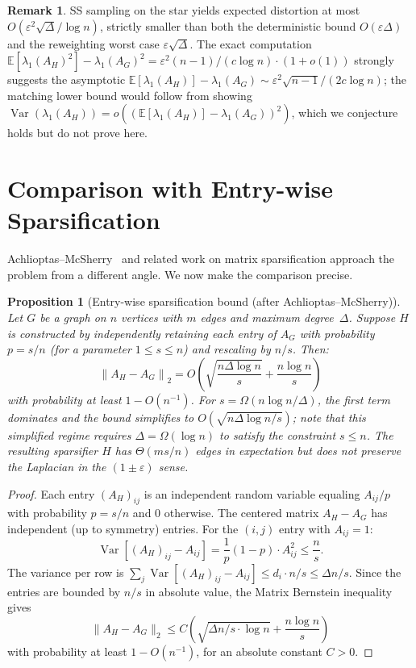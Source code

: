 \documentclass[11pt]{article}
\newtheorem{proposition}[theorem]{Proposition}
\theoremstyle{definition}
\newtheorem{remark}[theorem]{Remark}
\newcommand{\eps}{\varepsilon}
\newcommand{\lamH}{\lambda_1(A_H)}
\newcommand{\lamG}{\lambda_1(A_G)}
\newcommand{\AG}{A_G}
\newcommand{\AH}{A_H}
\newcommand{\E}{\mathbb{E}}
\DeclareMathOperator{\Var}{Var}
\begin{document}
\begin{remark}
SS sampling on the star yields expected distortion at most
$O(\eps^2\sqrt{\Delta}/\log n)$, strictly smaller than both the
deterministic bound $O(\eps\Delta)$ and the reweighting worst case $\eps\sqrt{\Delta}$.
The exact computation $\E[\lamH^2] - \lamG^2 = \eps^2(n-1)/(c\log n)\cdot(1+o(1))$
strongly suggests the asymptotic
$\E[\lamH] - \lamG \sim \eps^2\sqrt{n-1}/(2c\log n)$;
the matching lower bound would follow from showing
$\Var(\lamH) = o((\E[\lamH] - \lamG)^2)$, which we conjecture holds but do not
prove here.
\end{remark}


\section{Comparison with Entry-wise Sparsification}\label{sec:comparison}

Achlioptas--McSherry~\citep{achlioptas2007fast} and related work
on matrix sparsification approach the problem from a different angle. We now make the
comparison precise.

\begin{proposition}[Entry-wise sparsification bound (after Achlioptas--McSherry)]%
\label{prop:am}
Let $G$ be a graph on $n$ vertices with $m$ edges and maximum degree~$\Delta$.
Suppose $H$ is constructed by independently retaining
each entry of $\AG$ with probability $p = s/n$ (for a parameter $1 \leq s \leq n$)
and rescaling by $n/s$. Then:
\[
\left\|\AH - \AG\right\|_2
= O\!\left(\sqrt{\frac{n\Delta\log n}{s}} + \frac{n\log n}{s}\right)
\]
with probability at least $1 - O(n^{-1})$.
For $s = \Omega(n\log n / \Delta)$, the first term dominates and
the bound simplifies to $O(\sqrt{n\Delta\log n / s})$; note that this simplified
regime requires $\Delta = \Omega(\log n)$ to satisfy the constraint $s \leq n$.
The resulting sparsifier $H$ has $\Theta(ms/n)$ edges in expectation but does \emph{not}
preserve the Laplacian in the $(1\pm\eps)$ sense.
\end{proposition}

\begin{proof}
Each entry $(A_H)_{ij}$ is an independent random variable equaling $A_{ij}/p$ with
probability $p = s/n$ and $0$ otherwise. The centered matrix
$\AH - \AG$ has independent (up to symmetry) entries. For the $(i,j)$ entry
with $A_{ij} = 1$:
\[
\Var\!\left[(A_H)_{ij} - A_{ij}\right]
= \frac{1}{p}(1-p) \cdot A_{ij}^2
\leq \frac{n}{s}.
\]
The variance per row is $\sum_{j} \Var[(A_H)_{ij} - A_{ij}]
\leq d_i \cdot n/s \leq \Delta n/s$.
Since the entries are bounded by $n/s$ in absolute value, the Matrix Bernstein
inequality~\citep{tropp2012user,bandeira2016sharp} gives
\[
\|\AH - \AG\|_2
\leq C\!\left(\sqrt{\Delta n/s \cdot \log n} + \frac{n\log n}{s}\right)
\]
with probability at least $1 - O(n^{-1})$, for an absolute constant $C > 0$.
\end{proof}
\end{document}
